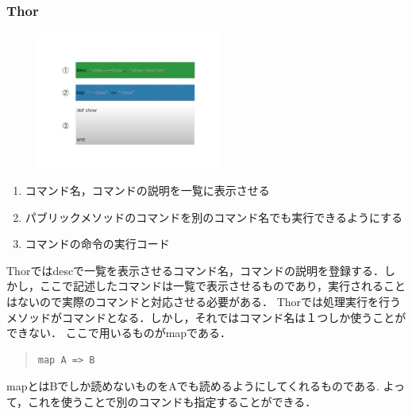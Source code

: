 \subsubsection{Thor}
\begin{figure}[htbp]\begin{center}
\includegraphics[width=6cm,bb=0 0 442 432]{../figs/./hikiutils_yamane_09_copy.004.jpg}
\caption{}
\label{default}\end{center}\end{figure}
\begin{enumerate}
\item コマンド名，コマンドの説明を一覧に表示させる
\item パブリックメソッドのコマンドを別のコマンド名でも実行できるようにする
\item コマンドの命令の実行コード
\end{enumerate}
Thorではdescで一覧を表示させるコマンド名，コマンドの説明を登録する．しかし，ここで記述したコマンドは一覧で表示させるものであり，実行されることはないので実際のコマンドと対応させる必要がある．
Thorでは処理実行を行うメソッドがコマンドとなる．しかし，それではコマンド名は１つしか使うことができない．
ここで用いるものがmapである．
\begin{quote}\begin{verbatim}
map A => B
\end{verbatim}\end{quote}
mapとはBでしか読めないものをAでも読めるようにしてくれるものである.
よって，これを使うことで別のコマンドも指定することができる．

